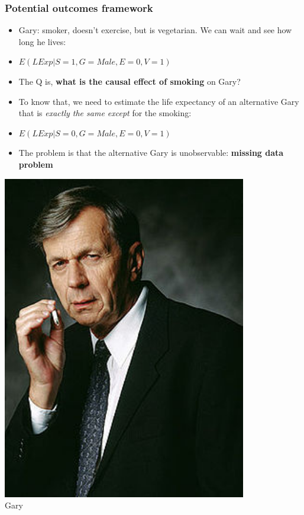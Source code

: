\documentclass[aspectratio=43]{beamer}
\begin{document}
\begin{frame}
\frametitle{Potential outcomes framework}
\centering


\begin{minipage}{0.7\textwidth}\centering
  \begin{itemize}\linespread{2}
    \item<1-> Gary: smoker, doesn't exercise, but is vegetarian. We can wait and see how long he lives:
    \item<1->[] {\small $E(LExp|S=1, G=Male, E=0, V=1)$}
    \item<2-> The Q is, \textbf{what is the causal effect of smoking} on Gary?
    \item<3-> To know that, we need to estimate the life expectancy of an alternative Gary that is \textit{exactly the same except} for the smoking:
    \item<3->[] {\small $E(LExp|S=0, G=Male, E=0, V=1)$}
    \item<4-> The problem is that the alternative Gary is unobservable: \textbf{missing data problem}
  \end{itemize}
\end{minipage}\hfill
\begin{minipage}{0.3\textwidth}\centering
\includegraphics[width = 0.8\textwidth]{../img/smoking_man}\\Gary
\end{minipage}


\end{frame}
\end{document}
